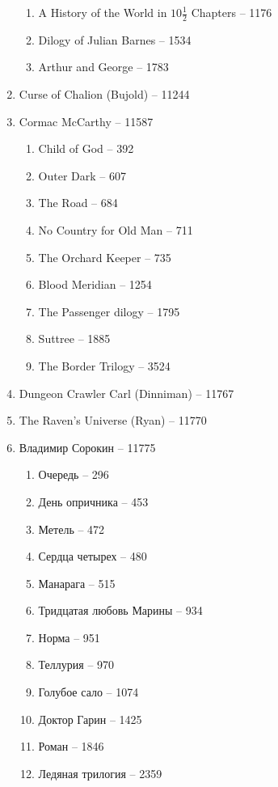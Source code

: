 \documentclass[a4paper, 11pt]{proc} %
\begin{document}
\begin{enumerate}
\begin{enumerate}
            \item A History of the World in $10 \frac{1}{2}$ Chapters -- 1176
            \item Dilogy of Julian Barnes -- 1534
            \item Arthur and George -- 1783
        \end{enumerate}
    \item Curse of Chalion (Bujold) -- 11244
    \item Cormac McCarthy -- 11587
        \begin{enumerate}
            \item Child of God -- 392
            \item Outer Dark -- 607
            \item The Road -- 684
            \item No Country for Old Man -- 711
            \item The Orchard Keeper -- 735
            \item Blood Meridian -- 1254
            \item The Passenger dilogy -- 1795
            \item Suttree -- 1885
            \item The Border Trilogy -- 3524
        \end{enumerate}
    \item Dungeon Crawler Carl (Dinniman) -- 11767
    \item The Raven's Universe (Ryan) -- 11770
    \item Владимир Сорокин -- 11775
        \begin{enumerate}
            \item Очередь -- 296
            \item День опричника -- 453
            \item Метель -- 472
            \item Сердца четырех -- 480
            \item Манарага -- 515
            \item Тридцатая любовь Марины -- 934
            \item Норма -- 951
            \item Теллурия -- 970
            \item Голубое сало -- 1074
            \item Доктор Гарин -- 1425
            \item Роман -- 1846
            \item Ледяная трилогия -- 2359

\end{enumerate}
\end{enumerate}
\end{document}
